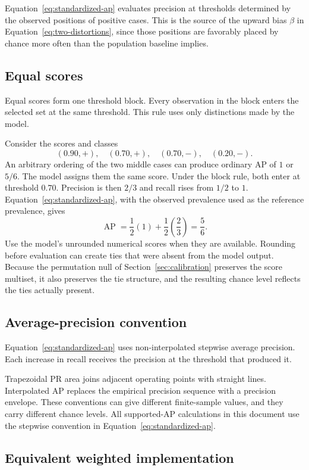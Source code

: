 \documentclass[11pt]{article}
\newcommand{\AP}{\operatorname{AP}}
\theoremstyle{remark}
\begin{document}
Equation~\eqref{eq:standardized-ap} evaluates precision at thresholds determined by the observed positions of positive cases. This is the source of the upward bias $\beta$ in Equation~\eqref{eq:two-distortions}, since those positions are favorably placed by chance more often than the population baseline implies.

\subsection{Equal scores}

Equal scores form one threshold block. Every observation in the block enters the selected set at the same threshold. This rule uses only distinctions made by the model.

Consider the scores and classes
\[
(0.90,+),\quad(0.70,+),\quad(0.70,-),\quad(0.20,-).
\]
An arbitrary ordering of the two middle cases can produce ordinary AP of $1$ or $5/6$. The model assigns them the same score. Under the block rule, both enter at threshold $0.70$. Precision is then $2/3$ and recall rises from $1/2$ to $1$. Equation~\eqref{eq:standardized-ap}, with the observed prevalence used as the reference prevalence, gives
\[
\AP
=
\frac12(1)+\frac12\left(\frac23\right)
=
\frac56.
\]
Use the model's unrounded numerical scores when they are available. Rounding before evaluation can create ties that were absent from the model output. Because the permutation null of Section~\ref{sec:calibration} preserves the score multiset, it also preserves the tie structure, and the resulting chance level reflects the ties actually present.

\subsection{Average-precision convention}

Equation~\eqref{eq:standardized-ap} uses non-interpolated stepwise average precision. Each increase in recall receives the precision at the threshold that produced it.

Trapezoidal PR area joins adjacent operating points with straight lines. Interpolated AP replaces the empirical precision sequence with a precision envelope. These conventions can give different finite-sample values, and they carry different chance levels. All supported-AP calculations in this document use the stepwise convention in Equation~\eqref{eq:standardized-ap}.

\subsection{Equivalent weighted implementation}
\end{document}
